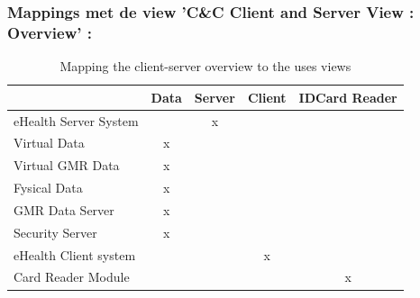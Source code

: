\documentclass[a4paper,10pt]{article}
\begin{document}
\subsubsection{Mappings met de view 'C\&C Client and Server View : Overview' :}
\begin{table}[h!]
\begin{center}
 \begin{tabular}{l|c|c|c|c|} 
 & Data & Server & Client & IDCard Reader\\ \hline
eHealth Server System & & x & & \\ \hline
\hspace{6pt}Virtual Data & x & & & \\ \hline
\hspace{12pt}Virtual GMR Data & x & & & \\ \hline
\hspace{6pt}Fysical Data & x & & & \\ \hline
\hspace{12pt}GMR Data Server & x & & & \\ \hline
\hspace{12pt}Security Server & x & & & \\ \hline
eHealth Client system & & & x & \\ \hline
\hspace{6pt}Card Reader Module & & & & x \\ \hline
\end{tabular}
\caption{Mapping the client-server overview to the uses views}
\end{center}
\end{table}

\clearpage
\end{document}
